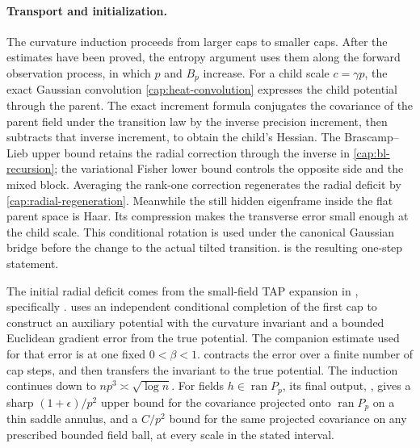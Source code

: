 \paragraph{Transport and initialization.}
The curvature induction proceeds from larger caps to smaller caps.
After the estimates have been proved, the entropy argument uses them
along the forward observation process, in which $p$ and $B_p$ increase.
For a child scale $c=\gamma p$, the exact Gaussian convolution
\eqref{cap:heat-convolution} expresses the child potential through the
parent. The exact increment formula conjugates the covariance of the
parent field under the transition law by the inverse precision increment,
then subtracts that inverse increment, to obtain the child's Hessian.
The Brascamp--Lieb upper bound retains
the radial correction through the inverse in \eqref{cap:bl-recursion};
the variational Fisher lower bound controls the opposite side and the
mixed block. Averaging the rank-one correction regenerates the radial
deficit by \eqref{cap:radial-regeneration}. Meanwhile the still hidden
eigenframe inside the flat parent space is Haar. Its compression makes
the transverse error small enough at the child scale. This conditional
rotation is used under the canonical Gaussian bridge before the change
to the actual tilted transition.  is the
resulting one-step statement.

The initial radial deficit comes from the small-field TAP expansion in
, specifically .
 uses an independent conditional
completion of the first cap to construct an auxiliary potential with the
curvature invariant and a bounded Euclidean gradient error from the true
potential. The companion estimate used for that error is at one fixed
$0<\beta<1$.  contracts the error over a
finite number of cap steps, and  then transfers
the invariant to the true potential. The induction continues down to
$np^3\asymp\sqrt{\log n}$. For fields $h\in\operatorname{ran}P_p$, its
final output, , gives a sharp
$(1+\epsilon)/p^2$ upper bound for the covariance projected onto
$\operatorname{ran}P_p$ on a thin saddle annulus, and a $C/p^2$ bound for
the same projected covariance on any prescribed bounded field ball, at
every scale in the stated interval.

